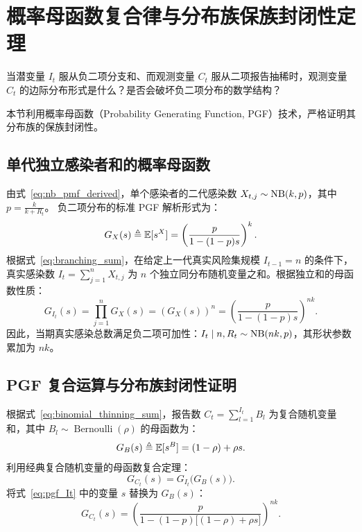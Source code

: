 \section{概率母函数复合律与分布族保族封闭性定理}\label{sec:pgf_closure}

当潜变量 $I_t$ 服从负二项分支和、而观测变量 $C_t$ 服从二项报告抽稀时，观测变量 $C_t$ 的边际分布形式是什么？是否会破坏负二项分布的数学结构？

本节利用概率母函数（Probability Generating Function, PGF）技术，严格证明其分布族的保族封闭性。

\subsection{单代独立感染者和的概率母函数}
由式~\eqref{eq:nb_pmf_derived}，单个感染者的二代感染数 $X_{t,j} \sim \operatorname{NB}(k, p)$，其中 $p = \frac{k}{k+R_t}$。
负二项分布的标准 PGF 解析形式为：
\begin{equation}
G_X(s) \triangleq \operatorname{\mathbb{E}}[s^X] = \left( \frac{p}{1 - (1-p)s} \right)^k.
\end{equation}
根据式~\eqref{eq:branching_sum}，在给定上一代真实风险集规模 $I_{t-1} = n$ 的条件下，真实感染数 $I_t = \sum_{j=1}^n X_{t,j}$ 为 $n$ 个独立同分布随机变量之和。根据独立和的母函数性质：
\begin{equation}
G_{I_t}(s) = \prod_{j=1}^n G_X(s) = \left( G_X(s) \right)^n = \left( \frac{p}{1 - (1-p)s} \right)^{nk}. \label{eq:pgf_It}
\end{equation}
因此，当期真实感染总数满足负二项可加性：$I_t \mid n, R_t \sim \operatorname{NB}(nk, p)$，其形状参数累加为 $nk$。

\subsection{PGF 复合运算与分布族封闭性证明}
根据式~\eqref{eq:binomial_thinning_sum}，报告数 $C_t = \sum_{l=1}^{I_t} B_l$ 为复合随机变量和，其中 $B_l \sim \operatorname{Bernoulli}(\rho)$ 的母函数为：
\begin{equation}
G_B(s) \triangleq \operatorname{\mathbb{E}}[s^B] = (1 - \rho) + \rho s.
\end{equation}
利用经典复合随机变量的母函数复合定理：
\begin{equation}
G_{C_t}(s) = G_{I_t}\big( G_B(s) \big).
\end{equation}
将式~\eqref{eq:pgf_It} 中的变量 $s$ 替换为 $G_B(s)$：
\begin{equation}
G_{C_t}(s) = \left( \frac{p}{1 - (1-p)\big[(1-\rho) + \rho s\big]} \right)^{nk}. \label{eq:pgf_Ct_step1}
\end{equation}

